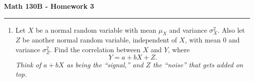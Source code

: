 \documentclass[11pt,letterpaper]{article}
\begin{document}
\begin{center}
{\bf \Large Math 130B - Homework 3}
\vspace{0.2cm}
\hrule
\end{center}



\begin{enumerate}

    \item Let $X$ be a normal random variable with mean $\mu_X$ and variance $\sigma_X^2$.
    Also let $Z$ be another normal random variable, independent of $X$, with mean 0 and variance $\sigma_Z^2$.
    Find the correlation between $X$ and $Y$, where
    \[
        Y = a + bX + Z.
    \]
    \emph{Think of $a+bX$ as being the ``signal,'' and $Z$ the ``noise'' that gets added on top.}

\end{enumerate}
\end{document}
